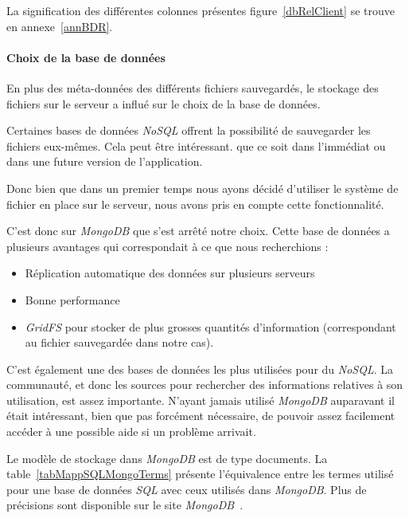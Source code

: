 \documentclass[a4paper,10pt, twoside]{report}
\begin{document}
\begin{spacing}{1.2}
La signification des diff\'erentes colonnes pr\'esentes figure~\ref{dbRelClient}
se trouve en annexe~\ref{annBDR}.

\paragraph{Choix de la base de donn\'ees}
En plus des m\'eta-donn\'ees des diff\'erents fichiers sauvegard\'es, le
stockage des fichiers sur le serveur a influ\'e sur le choix de la base de
donn\'ees. 

Certaines bases de donn\'ees \textit{NoSQL} offrent la possibilit\'e de 
sauvegarder les fichiers eux-m\^emes. Cela peut \^etre int\'eressant. que ce
soit dans l'imm\'ediat ou dans une future version de l'application.

Donc bien que dans un premier temps nous ayons d\'ecid\'e d'utiliser le
syst\`eme de fichier en place sur le serveur, nous avons pris en compte cette
fonctionnalit\'e.

C'est donc sur \textit{MongoDB} que s'est arr\^et\'e notre choix. Cette base
de donn\'ees a plusieurs avantages qui correspondait \`a ce que nous
recherchions :

\begin{itemize}
 \item R\'eplication automatique des donn\'ees sur plusieurs serveurs
 \item Bonne performance
 \item \textit{GridFS} pour stocker de plus grosses quantit\'es d'information
 (correspondant au fichier sauvegard\'ee dans notre cas).
\end{itemize}

C'est \'egalement une des bases de donn\'ees les plus utilis\'ees pour du
\textit{NoSQL}. La communaut\'e, et donc les sources pour rechercher des
informations relatives \`a son utilisation, est assez importante. N'ayant
jamais utilis\'e \textit{MongoDB} auparavant il \'etait int\'eressant, bien que
pas forc\'ement n\'ecessaire, de pouvoir assez facilement acc\'eder \`a une
possible aide si un probl\`eme arrivait.

Le mod\`ele de stockage dans \textit{MongoDB} est de type documents. La
table~\ref{tabMappSQLMongoTerms} pr\'esente l'\'equivalence entre les termes
utilis\'e pour une base de donn\'ees \textit{SQL} avec ceux utilis\'es dans
\textit{MongoDB}. Plus de pr\'ecisions sont disponible sur le site
\textit{MongoDB}~\cite{refMappingSQLMDB}.


\end{spacing}
\end{document}
